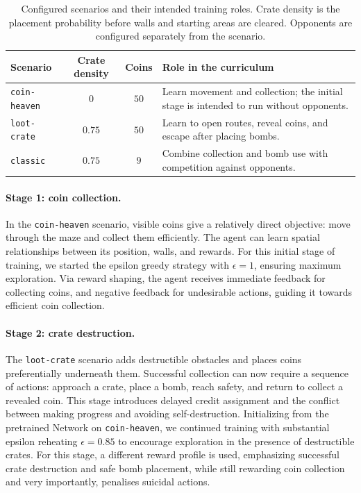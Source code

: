 \documentclass[11pt,a4paper]{article}
\begin{document}
\begin{table}[htbp]
\centering
\small
\begin{tabularx}{\textwidth}{@{}lccY@{}}
\toprule
Scenario & Crate density & Coins & Role in the curriculum \\
\midrule
\texttt{coin-heaven} & $0$ & $50$ & Learn movement and collection; the initial stage is intended to run without opponents. \\
\texttt{loot-crate} & $0.75$ & $50$ & Learn to open routes, reveal coins, and escape after placing bombs. \\
\texttt{classic} & $0.75$ & $9$ & Combine collection and bomb use with competition against opponents. \\
\bottomrule
\end{tabularx}
\caption{Configured scenarios and their intended training roles. Crate
density is the placement probability before walls and starting areas are
cleared. Opponents are configured separately from the scenario.}
\label{tab:curriculum}
\end{table}

\paragraph{Stage 1: coin collection.}
In the \texttt{coin-heaven} scenario, visible coins give a relatively direct
objective: move through the maze and collect them efficiently. The agent can
learn spatial relationships between its position, walls, and rewards.
For this initial stage of training, we started the epsilon greedy strategy with $\epsilon = 1$, ensuring maximum exploration. 
Via reward shaping, the agent receives immediate feedback for collecting coins, and negative feedback for undesirable actions, guiding it towards efficient coin collection.

\paragraph{Stage 2: crate destruction.}
The \texttt{loot-crate} scenario adds destructible obstacles and places coins
preferentially underneath them. Successful collection can now require a
sequence of actions: approach a crate, place a bomb, reach safety, and return
to collect a revealed coin. This stage introduces delayed credit assignment
and the conflict between making progress and avoiding self-destruction.
Initializing from the pretrained Network on \texttt{coin-heaven}, we continued training with substantial epsilon reheating $\epsilon = 0.85$ to encourage exploration in the presence of destructible crates. 
For this stage, a different reward profile is used, emphasizing successful crate destruction and safe bomb placement, while still rewarding coin collection and very importantly, penalises suicidal actions.
\end{document}
